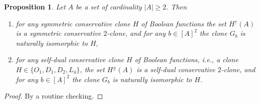 \documentclass[graybox]{SNmult}
\newtheorem{prop}{Proposition}
\theoremstyle{definition}
\begin{document}
\begin{prop}
	Let $A$ be a set of cardinality $|A|\geq 2$. Then
	\begin{enumerate}
		\item for any symmetric conservative clone $H$ of Boolean functions the set $H^\uparrow(A)$ is a symmetric conservative $2$-clone, and for any $b\in [A]^2$ the clone $G_b$ is naturally isomorphic to $H$, %
		\item for any self-dual conservative clone $H$ of Boolean functions, i.e., a clone $H\in \{O_1, D_1, D_2, L_4\}$, the set $H^\Uparrow(A)$ is a self-dual conservative $2$-clone, and for any $b\in [A]^2$ the clone $G_b$ is naturally isomorphic to $H$.
	\end{enumerate}
\end{prop}
\begin{proof}
	By a routine checking.
\end{proof}
\end{document}
